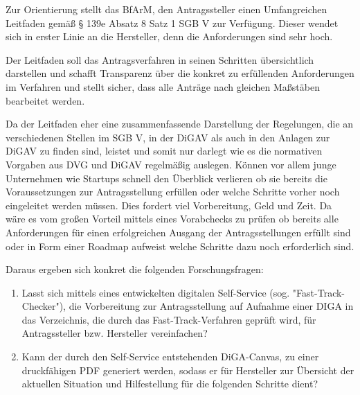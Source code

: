 Zur Orientierung stellt das BfArM, den Antragssteller einen Umfangreichen Leitfaden gemäß § 139e Absatz 8 Satz 1 SGB V zur Verfügung. Dieser wendet sich in erster Linie an die Hersteller, denn die Anforderungen sind sehr hoch.

Der Leitfaden soll das Antragsverfahren in seinen Schritten übersichtlich darstellen und schafft Transparenz über die konkret zu erfüllenden Anforderungen im Verfahren und stellt sicher, dass alle Anträge nach gleichen Maßstäben bearbeitet werden.

Da der Leitfaden eher eine zusammenfassende Darstellung der
Regelungen, die an verschiedenen Stellen im SGB V, in der DiGAV als auch in den Anlagen zur DiGAV zu finden sind, leistet und somit nur darlegt wie es die normativen Vorgaben aus DVG und DiGAV regelmäßig auslegen.
Können vor allem junge Unternehmen wie Startups schnell den Überblick verlieren ob sie bereits die Voraussetzungen zur Antragsstellung erfüllen oder welche Schritte vorher noch eingeleitet werden müssen.
Dies fordert viel Vorbereitung, Geld und Zeit. Da wäre es vom großen Vorteil mittels eines Vorabchecks zu prüfen ob bereits alle Anforderungen für einen erfolgreichen Ausgang der Antragsstellungen erfüllt sind oder in Form einer Roadmap aufweist welche Schritte dazu noch erforderlich sind.

 





Daraus ergeben sich konkret die folgenden Forschungsfragen:\\

\begin{enumerate}
         \item Lasst sich mittels eines entwickelten digitalen Self-Service (sog. "Fast-Track-Checker"), die Vorbereitung zur Antragsstellung auf Aufnahme einer DIGA in das Verzeichnis, die durch das Fast-Track-Verfahren geprüft wird, für Antragssteller bzw. Hersteller vereinfachen?
         \item Kann der durch den Self-Service entstehenden DiGA-Canvas, zu einer druckfähigen PDF generiert werden, sodass er für Hersteller zur Übersicht der aktuellen Situation und Hilfestellung für die folgenden Schritte dient?
      \end{enumerate}

